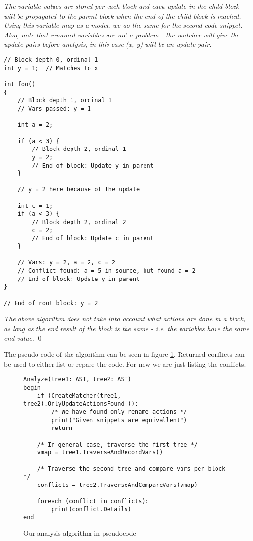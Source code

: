 \begin{exmp}
\bigskip
\textit{The variable values are stored per each block and each update in the child block will be propagated to the parent block when the end of the child block is reached. Using this variable map as a model, we do the same for the second code snippet. Also, note that renamed variables are not a problem - the matcher will give the update pairs before analysis, in this case (x, y) will be an update pair.}
\bigskip

\begin{lstlisting}
// Block depth 0, ordinal 1
int y = 1;  // Matches to x

int foo()
{
    // Block depth 1, ordinal 1
    // Vars passed: y = 1

    int a = 2;

    if (a < 3) {
        // Block depth 2, ordinal 1
        y = 2;
        // End of block: Update y in parent
    }

    // y = 2 here because of the update

    int c = 1;
    if (a < 3) {
        // Block depth 2, ordinal 2
        c = 2;
        // End of block: Update c in parent
    }

    // Vars: y = 2, a = 2, c = 2
    // Conflict found: a = 5 in source, but found a = 2
    // End of block: Update y in parent
}

// End of root block: y = 2
\end{lstlisting}

\bigskip
\textit{The above algorithm does not take into account what actions are done in a block, as long as the end result of the block is the same - i.e. the variables have the same end-value.}
\qed
\end{exmp}

The pseudo code of the algorithm can be seen in figure \ref{fig:AnalysisAlg}. Returned conflicts can be used to either list or repare the code. For now we are just listing the conflicts.

\begin{figure}[H]
\centering
\begin{lstlisting}
Analyze(tree1: AST, tree2: AST)
begin
    if (CreateMatcher(tree1, tree2).OnlyUpdateActionsFound()):
        /* We have found only rename actions */
        print("Given snippets are equivallent")
        return

    /* In general case, traverse the first tree */
    vmap = tree1.TraverseAndRecordVars()

    /* Traverse the second tree and compare vars per block */
    conflicts = tree2.TraverseAndCompareVars(vmap)

    foreach (conflict in conflicts):
        print(conflict.Details)
end
\end{lstlisting}
\caption{Our analysis algorithm in pseudocode}
\label{fig:AnalysisAlg}
\end{figure}
